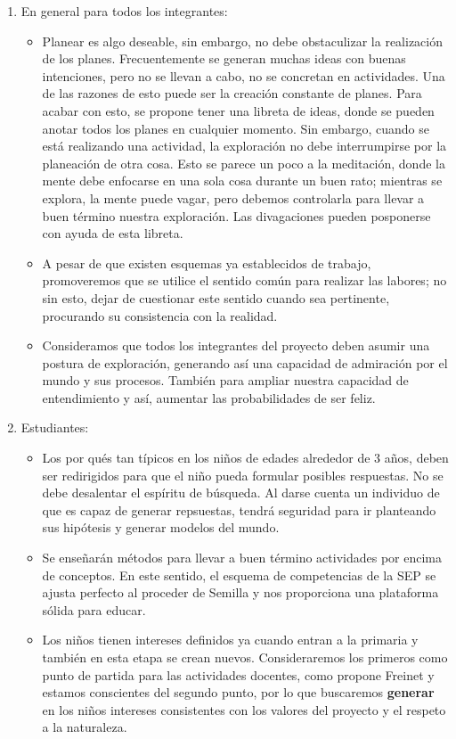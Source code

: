 \documentclass[10pt,letterpaper,oneside]{book}
\begin{document}
			\begin{enumerate}[label=\Alph*]
			\item En general para todos los integrantes:
			\begin{itemize}
			\item Planear es algo deseable, sin embargo, no debe obstaculizar la realización de los planes. Frecuentemente se generan muchas ideas con buenas intenciones, pero no se llevan a cabo, no se concretan en actividades. Una de las razones de esto puede ser la creación constante de planes. Para acabar con esto, se propone tener una libreta de ideas, donde se pueden anotar todos los planes en cualquier momento. Sin embargo, cuando se está realizando una actividad, la exploración no debe interrumpirse por la planeación de otra cosa. Esto se parece un poco a la meditación, donde la mente debe enfocarse en una sola cosa durante un buen rato; mientras se explora, la mente puede vagar, pero debemos controlarla para llevar a buen término nuestra exploración. Las divagaciones pueden posponerse con ayuda de esta libreta.
			\item A pesar de que existen esquemas ya establecidos de trabajo, promoveremos que se utilice el sentido común para realizar las labores; no sin esto, dejar de cuestionar este sentido cuando sea pertinente, procurando su consistencia con la realidad.
			\item Consideramos que todos los integrantes del proyecto deben asumir una postura de exploración, generando así una capacidad de admiración por el mundo y sus procesos. También para ampliar nuestra capacidad de entendimiento y así, aumentar las probabilidades de ser feliz.	
			\end{itemize}
\pagebreak %
			\item Estudiantes:
			\begin{itemize}
					\item Los por qués tan típicos en los niños de edades alrededor de 3 años, deben ser redirigidos para que el niño pueda formular posibles respuestas. No se debe desalentar el espíritu de búsqueda. Al darse cuenta un individuo de que es capaz de generar repsuestas, tendrá seguridad para ir planteando sus hipótesis y generar modelos del mundo.
					\item Se enseñarán métodos para llevar a buen término actividades por encima de conceptos. En este sentido, el esquema de competencias de la SEP se ajusta perfecto al proceder de Semilla y nos proporciona una plataforma sólida para educar.
					\item Los niños tienen intereses definidos ya cuando entran a la primaria y también en esta etapa se crean nuevos. Consideraremos los primeros como punto de partida para las actividades docentes, como propone Freinet y estamos conscientes del segundo punto, por lo que buscaremos {\bf generar} en los niños intereses consistentes con los valores del proyecto y el respeto a la naturaleza.

\end{itemize}
\end{enumerate}
\end{document}
